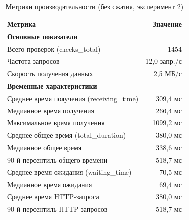 \documentclass[12pt]{article}
\begin{document}
\begin{table}[H]
    \centering
    \caption{Метрики производительности (без сжатия, эксперимент 2)}
    \label{tab:metrics}
    \begin{tabular}{lr}
        \toprule
        \textbf{Метрика}                          & \textbf{Значение} \\
        \midrule
        \multicolumn{2}{l}{\textbf{Основные показатели}}              \\
        Всего проверок (checks\_total)            & 1454              \\
        Частота запросов                          & 12,0 запр./с      \\
        Скорость получения данных                 & 2,5 МБ/с          \\
        \hline
        \multicolumn{2}{l}{\textbf{Временные характеристики}}         \\
        Среднее время получения (receiving\_time) & 309,4 мс          \\
        Медианное время получения                 & 266,4 мс          \\
        Максимальное время получения              & 1099,2 мс         \\
        Среднее общее время (total\_duration)     & 380,0 мс          \\
        Медианное общее время                     & 338,6 мс          \\
        90-й персентиль общего времени            & 518,7 мс          \\
        Среднее время ожидания (waiting\_time)    & 70,5 мс           \\
        Медианное время ожидания                  & 69,4 мс           \\
        Среднее время HTTP-запроса                & 380,0 мс          \\
        90-й персентиль HTTP-запросов             & 518,7 мс          \\
        \bottomrule
    \end{tabular}
\end{table}
\end{document}
